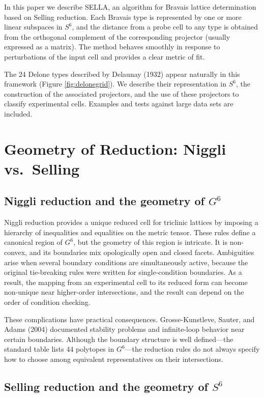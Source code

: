 \documentclass[preprint]{iucr}              %
\begin{document}
	In this paper we describe SELLA, an algorithm for Bravais lattice
	determination based on Selling reduction. Each Bravais type is represented by
	one or more linear subspaces in $S^6$, and the distance from a probe cell to
	any type is obtained from the orthogonal complement of the corresponding
	projector (usually expressed as a matrix).
	The method behaves smoothly in response to perturbations of the input cell and provides a clear metric of fit.
	
	The 24 Delone types described by Delaunay (1932) appear naturally in this
	framework (Figure \ref{fig:delonegrid}). We describe their representation in $S^6$, the construction of the
	associated projectors, and the use of these projectors to classify experimental
	cells. Examples and tests against large data sets are included.
	
	\section{Geometry of Reduction: Niggli vs.\ Selling}
	
	\subsection{Niggli reduction and the geometry of $G^6$}
	
	Niggli reduction provides a unique reduced cell for triclinic lattices by
	imposing a hierarchy of inequalities and equalities on the metric tensor.
	These rules define a canonical region of $G^6$, but the geometry of this
	region is intricate. It is non-convex, and its boundaries mix 
	opologically open and closed
	facets. Ambiguities arise when several boundary conditions are simultaneously
	active, because the original tie-breaking rules were written for
	single-condition boundaries. As a result, the mapping from an experimental
	cell to its reduced form can become non-unique near higher-order
	intersections, and the result can depend on the order of condition
	checking.
	
	These complications have practical consequences. Grosse-Kunstleve, Sauter,
	and Adams (2004) documented stability problems and infinite-loop behavior
	near certain boundaries. Although the boundary structure is well defined---the
	standard table lists 44 polytopes in $G^6$---the reduction rules do not always
	specify how to choose among equivalent representatives on their
	intersections.
	
	\subsection{Selling reduction and the geometry of $S^6$}
	
\end{document}
